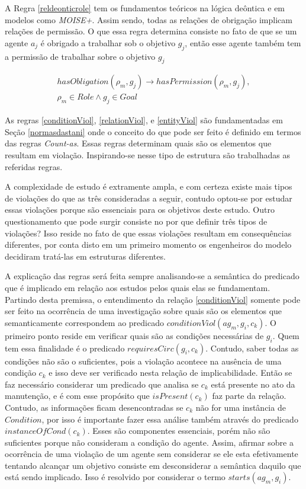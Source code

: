 A Regra \ref{reldeonticrole} tem os fundamentos teóricos na lógica deôntica e em modelos como \textit{MOISE+}. Assim sendo, todas as relações de obrigação implicam relações de permissão. O que essa regra determina consiste no fato de que se um agente $a_j$ é obrigado a trabalhar sob o objetivo $g_j$, então esse agente também tem a permissão de trabalhar sobre o objetivo $g_j$ 

\begin{eqnarray}\label{reldeonticrole}
	hasObligation(\rho_m,g_j) \to hasPermission(\rho_m,g_j), \nonumber \\
    \rho_m \in Role \wedge g_j \in Goal
\end{eqnarray}

As regras \ref{conditionViol}, \ref{relationViol}, e \ref{entityViol} são fundamentadas em Seção \ref{normasdastani} onde o conceito do que pode ser feito é definido em termos das regras \textit{Count-as}. Essas regras determinam quais são os elementos que resultam em violação. Inspirando-se nesse tipo de estrutura são trabalhadas as referidas regras. 

A complexidade de estudo é extramente ampla, e com certeza existe mais tipos de violações do que as três consideradas a seguir, contudo optou-se por estudar essas violações porque são essenciais para os objetivos deste estudo. Outro questionamento que pode surgir consiste no por que definir três tipos de violações? Isso reside no fato de que essas violações resultam em consequências diferentes, por conta disto em um primeiro momento os engenheiros do modelo decidiram tratá-las em estruturas diferentes. 

A explicação das regras será feita sempre analisando-se a semântica do predicado que é implicado em relação aos estudos pelos quais elas se fundamentam. Partindo desta premissa, o entendimento da relação \ref{conditionViol} somente pode ser feito na ocorrência de uma  investigação sobre quais são os elementos que semanticamente correspondem ao predicado $conditionViol(ag_m,g_i,c_k)$. O primeiro ponto reside em verificar quais são as condições necessárias de $g_i$. Quem tem essa finalidade é o predicado $requiresCirc(g_i,c_k)$. Contudo, saber todas as condições não são o suficientes, pois a violação acontece na ausência de uma condição $c_k$ e isso deve ser verificado nesta relação de implicabilidade. Então se faz necessário considerar um predicado que analisa se $c_k$ está presente no ato da manutenção, e é com esse propósito que $isPresent(c_k)$ faz parte da relação. Contudo, as informações ficam desencontradas se $c_k$ não for uma instância de $Condition$, por isso é importante fazer essa análise também através do predicado $instanceOfCond(c_k)$. Esses são componentes essenciais, porém não são suficientes porque não consideram a condição do agente. Assim, afirmar sobre a ocorrência de uma violação de um agente sem considerar se ele esta efetivamente tentando alcançar um objetivo consiste em desconsiderar a semântica daquilo que está sendo implicado. Isso é resolvido por considerar o termo  $starts(ag_m,g_i)$. 

